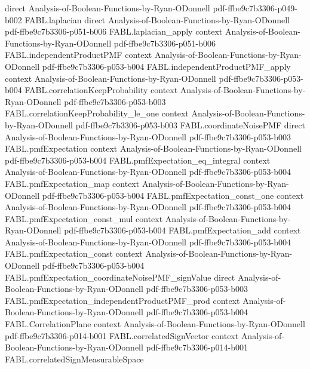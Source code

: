 \begin{theorem}
  {direct}
  {Analysis-of-Boolean-Functions-by-Ryan-ODonnell}
  {pdf-ffbe9c7b3306-p049-b002}
\proofstep
  {FABL.laplacian}
  {direct}
  {Analysis-of-Boolean-Functions-by-Ryan-ODonnell}
  {pdf-ffbe9c7b3306-p051-b006}
\proofstep
  {FABL.laplacian_apply}
  {context}
  {Analysis-of-Boolean-Functions-by-Ryan-ODonnell}
  {pdf-ffbe9c7b3306-p051-b006}
\proofstep
  {FABL.independentProductPMF}
  {context}
  {Analysis-of-Boolean-Functions-by-Ryan-ODonnell}
  {pdf-ffbe9c7b3306-p053-b004}
\proofstep
  {FABL.independentProductPMF_apply}
  {context}
  {Analysis-of-Boolean-Functions-by-Ryan-ODonnell}
  {pdf-ffbe9c7b3306-p053-b004}
\proofstep
  {FABL.correlationKeepProbability}
  {context}
  {Analysis-of-Boolean-Functions-by-Ryan-ODonnell}
  {pdf-ffbe9c7b3306-p053-b003}
\proofstep
  {FABL.correlationKeepProbability_le_one}
  {context}
  {Analysis-of-Boolean-Functions-by-Ryan-ODonnell}
  {pdf-ffbe9c7b3306-p053-b003}
\proofstep
  {FABL.coordinateNoisePMF}
  {direct}
  {Analysis-of-Boolean-Functions-by-Ryan-ODonnell}
  {pdf-ffbe9c7b3306-p053-b003}
\proofstep
  {FABL.pmfExpectation}
  {context}
  {Analysis-of-Boolean-Functions-by-Ryan-ODonnell}
  {pdf-ffbe9c7b3306-p053-b004}
\proofstep
  {FABL.pmfExpectation_eq_integral}
  {context}
  {Analysis-of-Boolean-Functions-by-Ryan-ODonnell}
  {pdf-ffbe9c7b3306-p053-b004}
\proofstep
  {FABL.pmfExpectation_map}
  {context}
  {Analysis-of-Boolean-Functions-by-Ryan-ODonnell}
  {pdf-ffbe9c7b3306-p053-b004}
\proofstep
  {FABL.pmfExpectation_const_one}
  {context}
  {Analysis-of-Boolean-Functions-by-Ryan-ODonnell}
  {pdf-ffbe9c7b3306-p053-b004}
\proofstep
  {FABL.pmfExpectation_const_mul}
  {context}
  {Analysis-of-Boolean-Functions-by-Ryan-ODonnell}
  {pdf-ffbe9c7b3306-p053-b004}
\proofstep
  {FABL.pmfExpectation_add}
  {context}
  {Analysis-of-Boolean-Functions-by-Ryan-ODonnell}
  {pdf-ffbe9c7b3306-p053-b004}
\proofstep
  {FABL.pmfExpectation_const}
  {context}
  {Analysis-of-Boolean-Functions-by-Ryan-ODonnell}
  {pdf-ffbe9c7b3306-p053-b004}
\proofstep
  {FABL.pmfExpectation_coordinateNoisePMF_signValue}
  {direct}
  {Analysis-of-Boolean-Functions-by-Ryan-ODonnell}
  {pdf-ffbe9c7b3306-p053-b003}
\proofstep
  {FABL.pmfExpectation_independentProductPMF_prod}
  {context}
  {Analysis-of-Boolean-Functions-by-Ryan-ODonnell}
  {pdf-ffbe9c7b3306-p053-b004}
\proofstep
  {FABL.CorrelationPlane}
  {context}
  {Analysis-of-Boolean-Functions-by-Ryan-ODonnell}
  {pdf-ffbe9c7b3306-p014-b001}
\proofstep
  {FABL.correlatedSignVector}
  {context}
  {Analysis-of-Boolean-Functions-by-Ryan-ODonnell}
  {pdf-ffbe9c7b3306-p014-b001}
\proofstep
  {FABL.correlatedSignMeasurableSpace}

\end{theorem}
